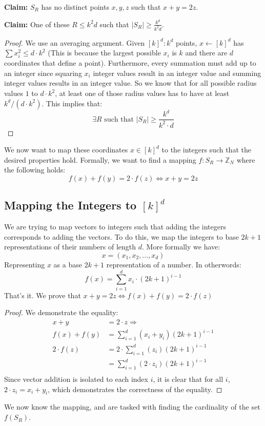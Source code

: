 \documentclass[11pt]{article}
\theoremstyle{definition}
\begin{document}
\textbf{Claim:} $S_R$ has no distinct points $x,y,z$ such that $x+y = 2z$.
\bigskip

\textbf{Claim:} One of these $R \leq k^2d$ such that $|S_R| \geq \frac{k^d}{k^2d}$.
\begin{proof}
    We use an averaging argument. Given $[k]^d: k^d$ points, $x \leftarrow [k]^d$ has $\sum x_i^2 \leq d \cdot k^2$ (This is because the largest possible $x_i$ is $k$ and there are $d$ coordinates that define a point). Furthermore, every summation must add up to an integer since squaring $x_i$ integer values result in an integer value and summing integer values results in an integer value. So we know that for all possible radius values $1$ to $d \cdot k^2$, at least one of those radius values has to have at least $k^d / (d \cdot k^2)$. This implies that: $$\exists R \text{ such that } |S_R| \geq \frac{k^d}{k^2\cdot d}$$
\end{proof}
We now want to map these coordinates $x \in [k]^d$ to the integers such that the desired properties hold. Formally, we want to find a mapping $f: S_R \rightarrow \mathbb{Z}_N$ where the following holds:
$$f(x) + f(y) = 2 \cdot f(z) \Leftrightarrow x + y = 2z$$
\subsection{Mapping the Integers to $[k]^d$}
We are trying to map vectors to integers such that adding the integers corresponds to adding the vectors. To do this, we map the integers to base $2k+1$ representations of their numbers of length $d$. More formally we have:
$$x = (x_1,x_2,..., x_d)$$
Representing $x$ as a base $2k + 1$ representation of a number. In otherwords:
$$f(x) = \sum_{i=1}^d x_i \cdot (2k+1)^{i-1}$$
That's it. We prove that $x + y = 2z \Longleftrightarrow f(x) + f(y) = 2 \cdot f(z)$
\begin{proof}
    We demonstrate the equality:
    \begin{align*}
        x + y &= 2 \cdot z \Rightarrow\\
        f(x) + f(y) &= \sum_{i=1}^d (x_i + y_i)(2k+1)^{i-1}\\
        2\cdot f(z) &= 2\cdot \sum_{i=1}^d(z_i)(2k+1)^{i-1}\\
        &= \sum_{i=1}^d(2 \cdot z_i)(2k+1)^{i-1}\\
    \end{align*}
    Since vector addition is isolated to each index $i$, it is clear that for all $i$, $2\cdot z_i = x_i + y_i$, which demonstrates the correctness of the equality.
\end{proof}
We now know the mapping, and are tasked with finding the cardinality of the set $f(S_R)$.
\end{document}
